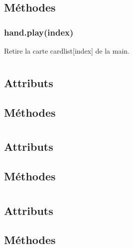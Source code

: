 \documentclass[11pt,oneside,a4paper]{article}
\begin{document}
\subsection{Méthodes}
	\subsubsection{hand.play(index)} Retire la carte cardlist[index] de la main.
\section{}
\subsection{Attributs}

\subsection{Méthodes}

\section{}
\subsection{Attributs}

\subsection{Méthodes}

\section{}
\subsection{Attributs}

\subsection{Méthodes}
\end{document}
